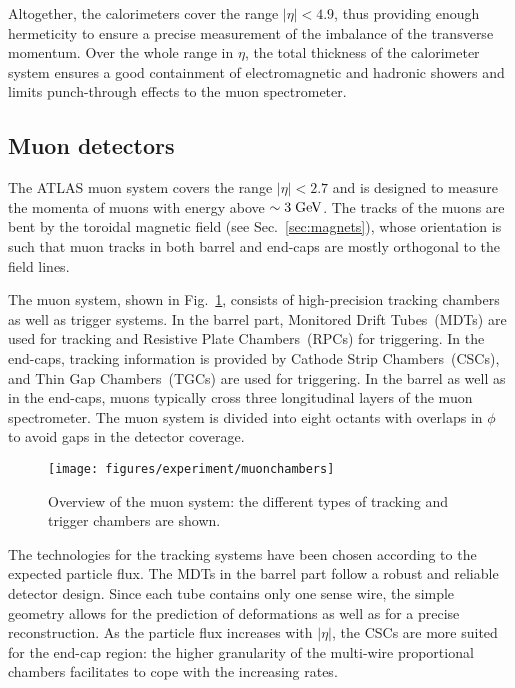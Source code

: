 Altogether, the calorimeters cover the range \mbox{$|\eta| < 4.9$},
thus providing enough hermeticity to ensure a precise measurement
of the imbalance of the transverse momentum.
Over the whole range in $\eta$, the total thickness of the calorimeter
system ensures a good containment of
electromagnetic and hadronic showers and limits punch-through effects to the muon spectrometer.

\subsection{Muon detectors}
\label{sec:muonspectrometer}

The ATLAS muon system covers the range \mbox{$|\eta| < 2.7$} and is
designed to measure the momenta of muons with energy above \mbox{$\sim
  3 \; \mathrm{GeV}$}. 
The tracks of the muons are bent by the toroidal magnetic field (see
Sec.~\ref{sec:magnets}), whose orientation is such that muon tracks in
both barrel and end-caps are mostly orthogonal to the field lines.

The muon system, shown in Fig.~\ref{fig:muons}, consists of
high-precision tracking chambers as well as trigger systems.
In the barrel part, Monitored Drift Tubes~(MDTs) are used for tracking
and Resistive Plate Chambers~(RPCs) for triggering.
In the end-caps, tracking information is provided by Cathode Strip
Chambers~(CSCs), and Thin Gap Chambers~(TGCs) are used for
triggering.
In the barrel as well as in the end-caps, muons typically cross three
longitudinal layers of the muon spectrometer.
The muon system is divided into eight octants with overlaps in $\phi$
to avoid gaps in the detector coverage.

\begin{figure}[ht]
\begin{center}
\texttt{[image: figures/experiment/muonchambers]}
\caption[Overview of the muon system]{
  Overview of the muon system:
  the different types of tracking and trigger chambers are shown.}
\label{fig:muons}
\end{center}
\end{figure}

The technologies for the tracking systems have been chosen according to
the expected particle flux.
The MDTs in the barrel part follow a robust and reliable detector design.
Since each tube contains only one sense wire, the simple geometry
allows for the prediction of deformations as well as for a precise
reconstruction.
As the particle flux increases with $|\eta|$, the CSCs are more suited
for the end-cap region: the higher granularity of the multi-wire
proportional chambers facilitates to cope with the increasing rates. 

